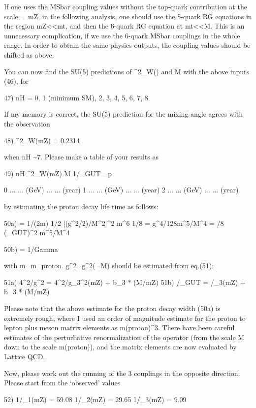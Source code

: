 \documentclass[12pt]{article}
\begin{document}
If one uses the MSbar coupling values without the top-quark
contribution at the scale \mu = mZ, in the following analysis, one
should use the 5-quark RG equations in the region mZ<\mu<mt, and
then the 6-quark RG equation at mt<\mu<M.  This is an unnecessary
complication, if we use the 6-quark MSbar couplings in the whole range.
In order to obtain the same physics outputs, the coupling values
should be shifted as above.

You can now find the SU(5) predictions of \sin^2\theta_W(\mz) and M
with the above inputs (46), for

47) nH = 0, 1 (minimum SM), 2, 3, 4, 5, 6, 7, 8.

If my memory is correct, the SU(5) prediction for the mixing angle
agrees with the observation

48) \sin^2\theta_W(mZ) = 0.2314

when nH \sim 7.   Please make a table of your results as

49)  nH     \sin^2\theta_W(mZ)   M         1/\alpha_GUT    \tau_p

   0     ...                   ... (GeV)   ...          ... (year)
   1     ...                   ... (GeV)   ...          ... (year)
   2     ...                   ... (GeV)   ...          ... (year)

by estimating the proton decay life time as follows:

50a) \Gamma = 1/(2m) 1/2 |(g^2/2)/M^2|^2 m^6 1/8\pi
            = g^4/128\pi m^5/M^4
            = \pi/8 (\alpha_GUT)^2 m^5/M^4

50b) \tau = 1/Gamma

with m=m_proton.  g^2=g^2(\mu=M) should be estimated from eq.(51):

51a) 4\pi^2/g^2     = 4\pi^2/g_3^2(mZ) + b_3 * \ln(M/mZ)
51b) \pi/\alpha_GUT = \pi/\alpha_3(mZ) + b_3 * \ln(M/mZ)

Please note that the above estimate for the proton decay width (50a)
is extremely rough, where I used an order of magnitude estimate for
the proton to lepton plus meson matrix elements as m(proton)^3.
There have been careful estimates of the perturbative renormalization
of the operator (from the scale M down to the scale m(proton)),
and the matrix elements are now evaluated by Lattice QCD.

Now, please work out the running of the 3 couplings in the
opposite direction.  Please start from the `observed' values

52) 1/\alpha_1(mZ) = 59.08
    1/\alpha_2(mZ) = 29.65
    1/\alpha_3(mZ) = 9.09
\end{document}
